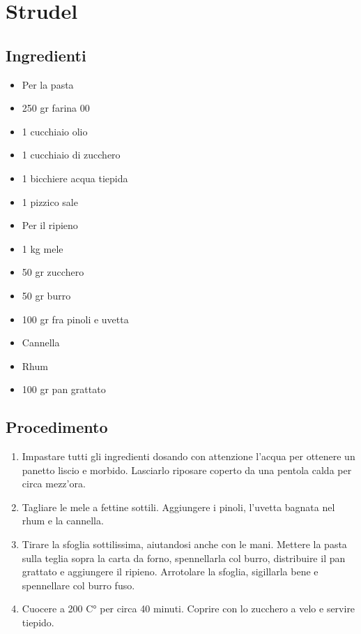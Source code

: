 \section{Strudel}
\subsection{Ingredienti}
\begin{itemize}
\item Per la pasta  
\item 250 gr farina 00  
\item 1 cucchiaio olio  
\item 1 cucchiaio di zucchero  
\item 1 bicchiere acqua tiepida  
\item 1 pizzico sale  
\item Per il ripieno  
\item 1 kg mele   
\item 50 gr zucchero  
\item 50 gr burro  
\item 100 gr fra pinoli e uvetta  
\item Cannella  
\item Rhum  
\item 100 gr pan grattato
\end{itemize}
\subsection{Procedimento}
\begin{enumerate}
\item  Impastare tutti gli ingredienti dosando con attenzione l'acqua per ottenere un panetto liscio e morbido. Lasciarlo riposare coperto da una pentola calda per circa mezz'ora.  
\item  Tagliare le mele a fettine sottili. Aggiungere i pinoli, l'uvetta bagnata nel rhum e la cannella.  
\item  Tirare la sfoglia sottilissima, aiutandosi anche con le mani. Mettere la pasta sulla teglia sopra la carta da forno, spennellarla col burro, distribuire il pan grattato e aggiungere il ripieno. Arrotolare la sfoglia, sigillarla bene e spennellare col burro fuso.  
\item  Cuocere a 200 C° per circa 40 minuti. Coprire con lo zucchero a velo e servire tiepido.
\end{enumerate}
